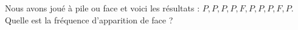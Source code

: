 
\begin{exercice}\label{exoSeconde-0025}

    Nous avons joué à pile ou face et voici les résultats : $ P,P,P,P,F,P,P,P,F,P$. Quelle est la fréquence d'apparition de face ?

\end{exercice}
